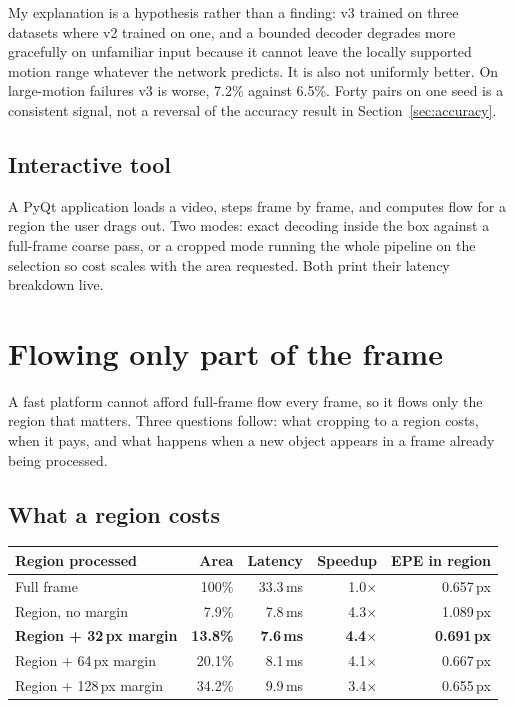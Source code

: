\documentclass[11pt,a4paper]{article}
\newcommand{\px}{\,px}
\newcommand{\ms}{\,ms}
\begin{document}
My explanation is a hypothesis rather than a finding: v3 trained on three datasets
where v2 trained on one, and a bounded decoder degrades more gracefully on
unfamiliar input because it cannot leave the locally supported motion range
whatever the network predicts. It is also not uniformly better. On large-motion
failures v3 is worse, 7.2\% against 6.5\%. Forty pairs on one seed is a consistent
signal, not a reversal of the accuracy result in Section~\ref{sec:accuracy}.

\subsection{Interactive tool}
A PyQt application loads a video, steps frame by frame, and computes flow for a
region the user drags out. Two modes: exact decoding inside the box against a
full-frame coarse pass, or a cropped mode running the whole pipeline on the
selection so cost scales with the area requested. Both print their latency
breakdown live.

\section{Flowing only part of the frame}
A fast platform cannot afford full-frame flow every frame, so it flows only the
region that matters. Three questions follow: what cropping to a region costs,
when it pays, and what happens when a new object appears in a frame already being
processed.

\subsection{What a region costs}
\begin{center}
\small
\begin{tabular}{lrrrr}
\toprule
Region processed & Area & Latency & Speedup & EPE in region \\
\midrule
Full frame & 100\% & 33.3\ms & 1.0$\times$ & 0.657\px \\
Region, no margin & 7.9\% & 7.8\ms & 4.3$\times$ & 1.089\px \\
\textbf{Region + 32\,px margin} & \textbf{13.8\%} & \textbf{7.6\ms} & \textbf{4.4$\times$} & \textbf{0.691\px} \\
Region + 64\,px margin & 20.1\% & 8.1\ms & 4.1$\times$ & 0.667\px \\
Region + 128\,px margin & 34.2\% & 9.9\ms & 3.4$\times$ & 0.655\px \\
\bottomrule
\end{tabular}
\end{center}
\end{document}
